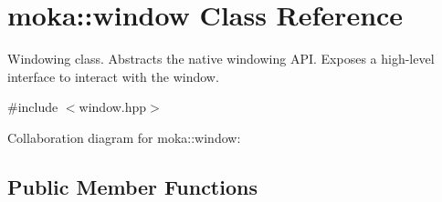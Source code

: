 \hypertarget{classmoka_1_1window}{}\section{moka\+::window Class Reference}
\label{classmoka_1_1window}


Windowing class. Abstracts the native windowing A\+PI. Exposes a high-\/level interface to interact with the window.  




{\ttfamily \#include $<$window.\+hpp$>$}



Collaboration diagram for moka\+::window\+:
\subsection*{Public Member Functions}
